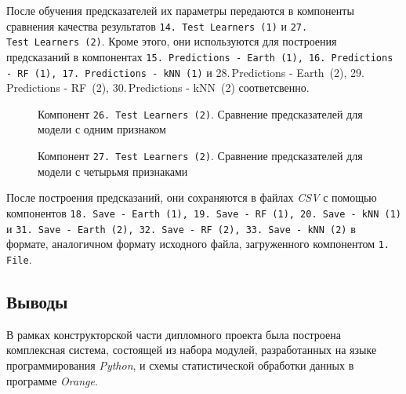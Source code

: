 После обучения предсказателей их параметры передаются в компоненты сравнения качества результатов \texttt{14.\,Test~Learners~(1)} и \texttt{27.\,Test~Learners~(2)}. Кроме этого, они используются для построения предсказаний в компонентах \texttt{15.\,Predictions - Earth~(1), 16.\,Predictions - RF~(1), 17.\,Predictions - kNN~(1)} и {28.\,Predictions - Earth~(2), 29.\,Predictions - RF~(2), 30.\,Predictions - kNN~(2)} соответсвенно.

\begin{figure}[tbp]
    \caption{Компонент \texttt{26.\,Test~Learners~(2)}. Сравнение предсказателей для модели с одним признаком}
    \label{img:14-Test-Learners-1}
\end{figure}

\begin{figure}[tbp]
    \caption{Компонент \texttt{27.\,Test~Learners~(2)}. Сравнение предсказателей для модели с четырьмя признаками}
    \label{img:27-Test-Learners-2}
\end{figure}

После построения предсказаний, они сохраняются в файлах \textit{CSV} с помощью компонентов \texttt{18.\,Save - Earth~(1), 19.\,Save - RF~(1), 20.\,Save - kNN~(1)} и \texttt{31.\,Save - Earth~(2), 32.\,Save - RF~(2), 33.\,Save - kNN~(2)} в формате, аналогичном формату исходного файла, загруженного компонентом \texttt{1.\,File}.


\subsection{Выводы}
В рамках конструкторской части дипломного проекта была построена комплексная система, состоящей из набора модулей, разработанных на языке программирования \textit{Python}, и схемы статистической обработки данных в программе \textit{Orange}.